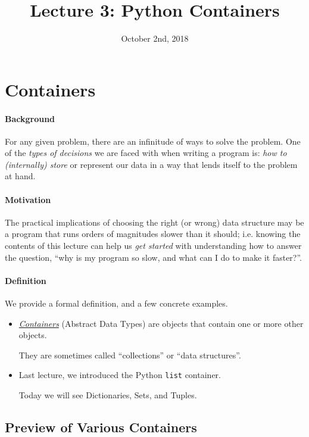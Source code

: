 \documentclass[12pt,letterpaper,twoside]{article}
\begin{document}
\title{Lecture 3: Python Containers \vspace{-5ex}}
\date{October 2nd, 2018}
\maketitle

\section{Containers}
\paragraph{Background}
For any given problem, there are an infinitude of ways to solve the problem.
One of the \emph{types of decisions} we are faced with when writing a program is: \emph{how to (internally) store} or represent 
our data in a way that lends itself to the problem at hand. 

\paragraph{Motivation}
The practical implications of choosing the right (or wrong) data structure
may be a program that runs orders of magnitudes slower than it should; i.e. knowing the contents of this lecture can help us \emph{get 
started} with understanding how to answer the question, ``why is my program so slow, and what can I do to make it faster?''.

\paragraph{Definition} We provide a formal definition, and a few concrete examples.
\begin{itemize}
\item \href{https://en.wikipedia.org/wiki/Container_(abstract_data_type)}{\emph{Containers}} (Abstract Data Types) 
  are objects that contain one or more other objects.

  They are sometimes called ``collections'' or ``data structures''.
\item Last lecture, we introduced the Python \texttt{list} container.
  
  Today we will see Dictionaries, Sets, and Tuples.
\end{itemize}

\subsection{Preview of Various Containers}
\end{document}

